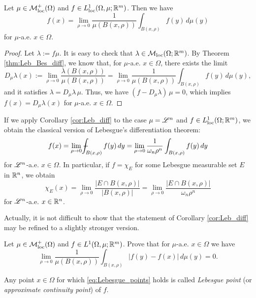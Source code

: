 \begin{corollary}\label{cor:Leb_diff}
Let $\mu \in \mathcal{M}^+_{\rm loc}(\Omega)$ and $f \in L^{1}_{\rm loc}(\Omega, \mu; \mathbb{R}^{m})$. Then we have
\begin{equation*}
f(x) = \lim_{\rho \to 0} \frac{1}{\mu(B(x,\rho))}\int_{B(x, \rho)} f(y) \, d \mu(y)
\end{equation*} 
for $\mu$-a.e. $x \in \Omega$.
\end{corollary}
\begin{proof}
Let $\lambda := f \mu$. It is easy to check that $\lambda \in \mathcal{M}_{\rm loc}(\Omega; \mathbb{R}^{m})$.
By Theorem \ref{thm:Leb_Bes_diff}, we know that, for $\mu$-a.e. $x \in \Omega$, there exists the limit 
\begin{equation*}
D_{\mu}\lambda(x) := \lim_{\rho \to 0} \frac{\lambda(B(x,\rho))}{\mu(B(x,\rho))} = \lim_{\rho \to 0} \frac{1}{\mu(B(x,\rho))}\int_{B(x, \rho)} f(y) \, d \mu(y),
\end{equation*}
and it satisfies $\lambda = D_{\mu}\lambda \, \mu$. Thus, we have $(f - D_{\mu}\lambda) \, \mu = 0$, which implies $f(x) = D_{\mu}\lambda(x)$ for $\mu$-a.e. $x \in \Omega$.
\end{proof}

\begin{remark}
If we apply Corollary \ref{cor:Leb_diff} to the case $\mu = \mathscr{L}^{n}$ and $f \in L^{1}_{\rm loc}(\Omega; \mathbb{R}^{m})$, we obtain the classical version of Lebesgue's differentiation theorem:
\begin{equation*}
f(x) = \lim_{\rho \to 0} -\hspace{-1.13em}\int_{B(x, \rho)} f(y) \, dy = \lim_{\rho \to 0} \frac{1}{\omega_{n} \rho^{n}} \int_{B(x, \rho)} f(y) \, dy
\end{equation*}
for $\mathscr{L}^{n}$-a.e. $x \in \Omega$.
In particular, if $f = \chi_{E}$ for some Lebesgue measurable set $E$ in $\mathbb{R}^{n}$, we obtain
\begin{equation} \label{density_points_set}
\chi_{E}(x) = \lim_{\rho \to 0} \frac{|E \cap B(x, \rho)|}{|B(x, \rho)|} =  \lim_{\rho \to 0} \frac{|E \cap B(x, \rho)|}{\omega_{n} \rho^{n}}
\end{equation}
for $\mathscr{L}^{n}$-a.e. $x \in \mathbb{R}^{n}$.
\end{remark}

Actually, it is not difficult to show that the statement of Corollary \ref{cor:Leb_diff} may be refined to a slightly stronger version.

\begin{corollary}
Let $\mu \in \mathcal{M}^{+}_{\rm loc}(\Omega)$ and $f \in L^{1}(\Omega, \mu; \mathbb{R}^{m})$. Prove that for $\mu$-a.e. $x \in \Omega$ we have
\begin{equation} \label{eq:Lebesgue_points}
\lim_{\rho \to 0} \frac{1}{\mu(B(x, \rho))} \int_{B(x, \rho)}|f(y) - f(x)| \, d \mu(y) = 0.
\end{equation}
\end{corollary}
Any point $x \in \Omega$ for which \eqref{eq:Lebesgue_points} holds is called {\em Lebesgue point} (or {\em approximate continuity point}) of $f$.

